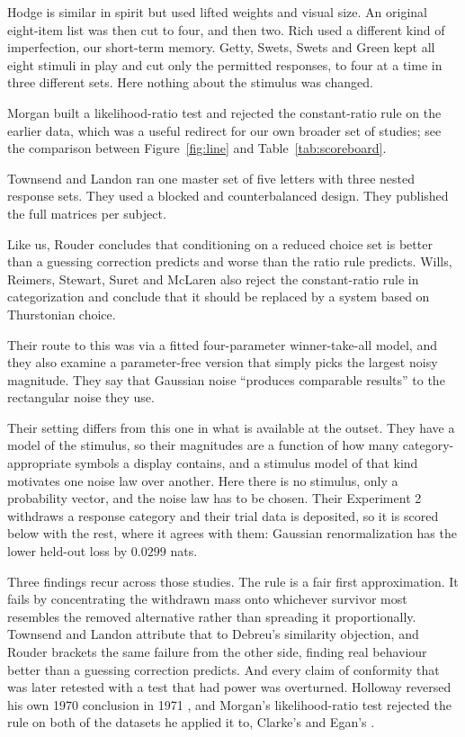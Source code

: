 \documentclass[11pt]{article}
\begin{document}
Hodge \cite{hodge1967} is similar in spirit but used lifted weights and visual size. An original
eight-item list was then cut to four, and then two. Rich \cite{rich1971} used a different kind of
imperfection, our short-term memory. Getty, Swets, Swets and Green \cite{getty1979} kept all
eight stimuli in play and cut only the permitted responses, to four at a time in three different
sets. Here nothing about the stimulus was changed.

Morgan \cite{morgan1974} built a likelihood-ratio test and rejected the constant-ratio rule on
the earlier data, which was a useful redirect for our own broader set of studies; see the
comparison between Figure~\ref{fig:line} and Table~\ref{tab:scoreboard}.

Townsend and Landon \cite{townsendlandon1982} ran one master set of five letters with three
nested response sets. They used a blocked and counterbalanced design. They published the full
matrices per subject.

Like us, Rouder \cite{rouder2004} concludes that conditioning on a reduced choice set
is better than a guessing correction predicts and worse than the ratio rule predicts.
Wills, Reimers, Stewart, Suret and McLaren \cite{wills2000} also reject the constant-ratio rule
in categorization and conclude that it should be replaced by a system based on Thurstonian
choice.

Their route to this was via a fitted
four-parameter winner-take-all model, and they also examine a parameter-free version that simply
picks the largest noisy magnitude. They say that Gaussian noise ``produces comparable results''
to the rectangular noise they use.

Their setting differs from this one in what is available at the outset. They have a model of the
stimulus, so their magnitudes are a function of how many category-appropriate symbols a display
contains, and a stimulus model of that kind motivates one noise law over another. Here there is
no stimulus, only a probability vector, and the noise law has to be chosen. Their Experiment 2
withdraws a response category and their trial data is deposited, so it is scored below with the
rest, where it agrees with them: Gaussian renormalization has the lower held-out loss by
$0.0299$ nats.

Three findings recur across those studies. The rule is a fair first approximation. It fails by
concentrating the withdrawn mass onto whichever survivor most resembles the removed alternative
rather than spreading it proportionally. Townsend and Landon attribute that to Debreu's
similarity objection, and Rouder brackets the same failure from the other side, finding real
behaviour better than a guessing correction predicts. And every claim of conformity that was later
retested with a test that had power was overturned. Holloway reversed his own 1970 conclusion in
1971 \cite{holloway1970,holloway1971}, and Morgan's likelihood-ratio test rejected the rule on
both of the datasets he applied it to, Clarke's and Egan's \cite{egan1957,morgan1974}.
\end{document}
